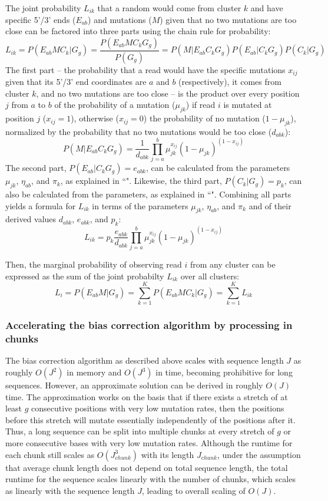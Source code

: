 \documentclass[11pt]{article}
\begin{document}
The joint probability $L_{ik}$ that a random would come from cluster $k$ and have specific 5'/3' ends ($E_{ab}$) and mutations ($M$) given that no two mutations are too close can be factored into three parts using the chain rule for probability:
$$L_{ik} = P(E_{ab} M C_k | G_g) = \frac{P(E_{ab} M C_k G_g)}{P(G_g)} = P(M | E_{ab} C_k G_g) P(E_{ab} | C_k G_g) P(C_k | G_g)$$
The first part -- the probability that a read would have the specific mutations $x_{ij}$ given that its 5'/3' end coordinates are $a$ and $b$ (respectively), it comes from cluster $k$, and no two mutations are too close -- is the product over every position $j$ from $a$ to $b$ of the probability of a mutation ($\mu_{jk}$) if read $i$ is mutated at position $j$ ($x_{ij} = 1$), otherwise ($x_{ij} = 0$) the probability of no mutation ($1 - \mu_{jk}$), normalized by the probability that no two mutations would be too close ($d_{abk}$):
$$P(M | E_{ab} C_k G_g) = \frac{1}{d_{abk}} \prod_{j=a}^{b} \mu_{jk}^{x_{ij}} (1 - \mu_{jk})^{(1 - x_{ij})}$$
The second part, $P(E_{ab} | C_k G_g) = e_{abk}$, can be calculated from the parameters $\mu_{jk}$, $\eta_{ab}$, and $\pi_k$, as explained in ``".
Likewise, the third part, $P(C_k | G_g) = p_k$, can also be calculated from the parameters, as explained in ``".
Combining all parts yields a formula for $L_{ik}$ in terms of the parameters $\mu_{jk}$, $\eta_{ab}$, and $\pi_k$ and of their derived values $d_{abk}$, $e_{abk}$, and $p_k$:
$$L_{ik} = p_k \frac{e_{abk}}{d_{abk}} \prod_{j=a}^{b} \mu_{jk}^{x_{ij}} (1 - \mu_{jk})^{(1 - x_{ij})}$$

Then, the marginal probability of observing read $i$ from any cluster can be expressed as the sum of the joint probabilty $L_{ik}$ over all clusters:
$$L_i = P(E_{ab} M | G_g) = \sum_{k=1}^K P(E_{ab} M C_k | G_g) = \sum_{k=1}^K L_{ik}$$

\subsubsection{Accelerating the bias correction algorithm by processing in chunks}

The bias correction algorithm as described above scales with sequence length $J$ as roughly $O(J^2)$ in memory and $O(J^3)$ in time, becoming prohibitive for long sequences.
However, an approximate solution can be derived in roughly $O(J)$ time.
The approximation works on the basis that if there exists a stretch of at least $g$ consecutive positions with very low mutation rates, then the positions before this stretch will mutate essentially independently of the positions after it.
Thus, a long sequence can be split into multiple chunks at every stretch of $g$ or more consecutive bases with very low mutation rates.
Although the runtime for each chunk still scales as $O(J_{chunk}^3)$ with its length $J_{chunk}$, under the assumption that average chunk length does not depend on total sequence length, the total runtime for the sequence scales linearly with the number of chunks, which scales as linearly with the sequence length $J$, leading to overall scaling of $O(J)$.
\end{document}
